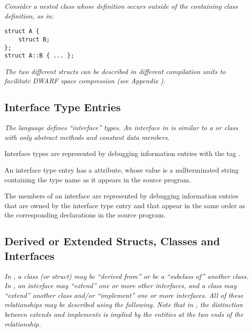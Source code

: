 \textit{Consider a nested class whose 
definition occurs outside of the containing class definition, as in:}

\begin{lstlisting}
struct A {
    struct B;
};
struct A::B { ... };
\end{lstlisting}

\textit{The two different structs can be described in 
different compilation units to 
facilitate DWARF space compression 
(see Appendix ).}

\subsection{Interface Type Entries}
\label{chap:interfacetypeentries}

\textit{The  language defines ``interface'' types. 
An interface
in  is similar to a  or 
 class with only abstract
methods and constant data members.}

Interface types 
are represented by debugging information
entries with the 
tag .

An interface type entry has 
a  attribute,
whose
value is a null\dash terminated string containing the type name
as it appears in the source program.

The members of an interface are represented by debugging
information entries that are owned by the interface type
entry and that appear in the same order as the corresponding
declarations in the source program.

\subsection{Derived or Extended Structs, Classes and Interfaces}
\label{chap:derivedorextendedstructsclasesandinterfaces}

\textit{In , a class (or struct) 
may 
be ``derived from'' or be a
``subclass of'' another class. 
In , an interface may ``extend''
one 
or more other interfaces, and a class may ``extend'' another
class and/or ``implement'' one or more interfaces. All of these
relationships may be described using the following. Note that
in , 
the distinction between extends and implements is
implied by the entities at the two ends of the relationship.}

